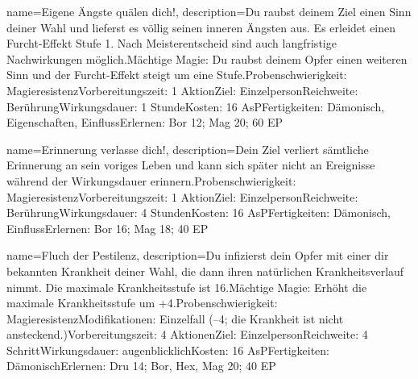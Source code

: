 {
    name={Eigene Ängste quälen dich!},
    description={Du raubst deinem Ziel einen Sinn deiner Wahl und lieferst es völlig seinen inneren Ängsten aus. Es erleidet einen Furcht-Effekt Stufe 1. Nach Meisterentscheid sind auch langfristige Nachwirkungen möglich.\newline Mächtige Magie: Du raubst deinem Opfer einen weiteren Sinn und der Furcht-Effekt steigt um eine Stufe.\newline Probenschwierigkeit: Magieresistenz\newline Vorbereitungszeit: 1 Aktion\newline Ziel: Einzelperson\newline Reichweite: Berührung\newline Wirkungsdauer: 1 Stunde\newline Kosten: 16 AsP\newline Fertigkeiten: Dämonisch, Eigenschaften, Einfluss\newline Erlernen: Bor 12; Mag 20; 60 EP}
}


{
    name={Erinnerung verlasse dich!},
    description={Dein Ziel verliert sämtliche Erinnerung an sein voriges Leben und kann sich später nicht an Ereignisse während der Wirkungsdauer erinnern.\newline Probenschwierigkeit: Magieresistenz\newline Vorbereitungszeit: 1 Aktion\newline Ziel: Einzelperson\newline Reichweite: Berührung\newline Wirkungsdauer: 4 Stunden\newline Kosten: 16 AsP\newline Fertigkeiten: Dämonisch, Einfluss\newline Erlernen: Bor 16; Mag 18; 40 EP}
}


{
    name={Fluch der Pestilenz},
    description={Du infizierst dein Opfer mit einer dir bekannten Krankheit deiner Wahl, die dann ihren natürlichen Krankheitsverlauf nimmt. Die maximale Krankheitsstufe ist 16.\newline Mächtige Magie: Erhöht die maximale Krankheitsstufe um +4.\newline Probenschwierigkeit: Magieresistenz\newline Modifikationen: Einzelfall (–4; die Krankheit ist nicht ansteckend.)\newline Vorbereitungszeit: 4 Aktionen\newline Ziel: Einzelperson\newline Reichweite: 4 Schritt\newline Wirkungsdauer: augenblicklich\newline Kosten: 16 AsP\newline Fertigkeiten: Dämonisch\newline Erlernen: Dru 14; Bor, Hex, Mag 20; 40 EP}
}


